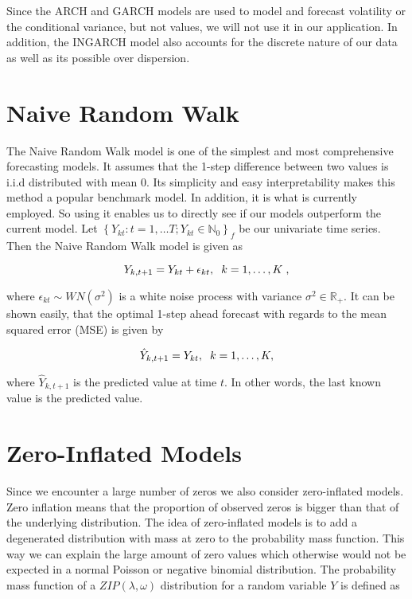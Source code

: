 Since the ARCH and GARCH models are used to model and forecast volatility or the conditional variance, but not values, we will not use it in our application. In addition, the INGARCH model also accounts for the discrete nature of our data as well as its possible over dispersion. 


\section{Naive Random Walk}
\label{sec: Naive Random Walk}

The Naive Random Walk model is one of the simplest and most comprehensive forecasting models. It assumes that the 1-step difference between two values is i.i.d distributed with mean 0. Its simplicity and easy interpretability makes this method a popular benchmark model. In addition, it is what is currently employed. So using it enables us to directly see if our models outperform the current model. Let $\left\{Y_{kt}:t=1,\ldots T; Y_{kt} \in \mathbb{N}_0\right\}_f$ be our univariate time series. Then the Naive Random Walk model is given as

\begin{equation}
Y_{k,t+1}= Y_{kt} + \epsilon_{kt},\hspace{0.2cm} k=1,\ldots,K \hspace{0.1cm}, 
\label{eq: Random Walk Model}
\end{equation}
 
where $\epsilon_{kt} \sim WN(\sigma^2)$ is a white noise process with variance $\sigma^2 \in \mathbb{R}_+$. It can be shown easily, that the optimal 1-step ahead forecast with regards to the mean squared error (MSE) is given by

\begin{equation}
\hat{Y}_{k,t+1}= Y_{kt} ,\hspace{0.2cm} k=1,\ldots,K ,
\label{eq: Random Walk Model Prediction}
\end{equation}

where $\hat{Y}_{k,t+1}$ is the predicted value at time $t$. In other words, the last known value is the predicted value. 


\section{Zero-Inflated Models}
\label{sec: Zim}

Since we encounter a large number of zeros we also consider zero-inflated models. Zero inflation means that the proportion of observed zeros is bigger than that of the underlying distribution. The idea of zero-inflated models is to add a degenerated distribution with mass at zero to the probability mass function. This way we can explain the large amount of zero values which otherwise would not be expected in a normal Poisson or negative binomial distribution. The probability mass function of a $ZIP(\lambda,\omega)$ distribution for a random variable $Y$ is defined as \cite{Zhu:2012}

